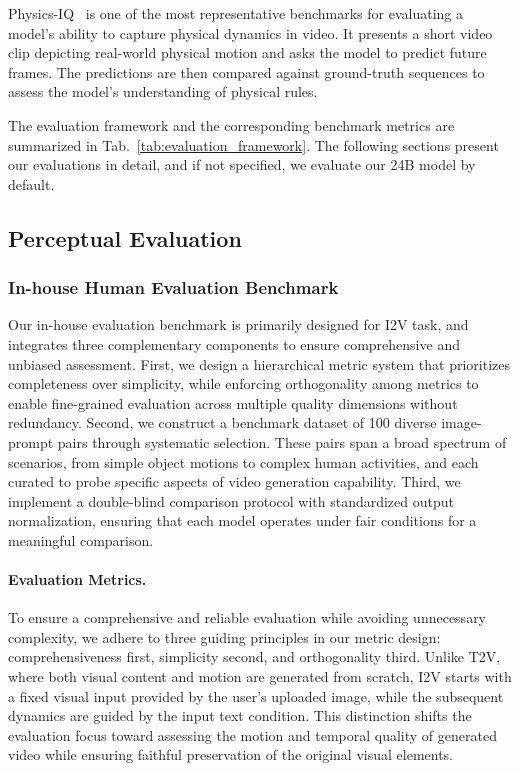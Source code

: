 Physics-IQ~\citep{physicsiqbenchmark} is one of the most representative benchmarks for evaluating a model’s ability to capture physical dynamics in video. It presents a short video clip depicting real-world physical motion and asks the model to predict future frames. The predictions are then compared against ground-truth sequences to assess the model’s understanding of physical rules.

The evaluation framework and the corresponding benchmark metrics are summarized in Tab.~\ref{tab:evaluation_framework}. The following sections present our evaluations in detail, and if not specified, we evaluate our 24B model by default.




\subsection{Perceptual Evaluation}
\subsubsection{In-house Human Evaluation Benchmark}
\label{sec:i2v_human_evaluation} 
Our in-house evaluation benchmark is primarily designed for I2V task, and integrates three complementary components to ensure comprehensive and unbiased assessment.
First, we design a hierarchical metric system that prioritizes completeness over simplicity, while enforcing orthogonality among metrics to enable fine-grained evaluation across multiple quality dimensions without redundancy.
Second, we construct a benchmark dataset of 100 diverse image-prompt pairs through systematic selection. These pairs span a broad spectrum of scenarios, from simple object motions to complex human activities, and each curated to probe specific aspects of video generation capability.
Third, we implement a double-blind comparison protocol with standardized output normalization, ensuring that each model operates under fair conditions for a meaningful comparison.



\paragraph{Evaluation Metrics.}

To ensure a comprehensive and reliable evaluation while avoiding unnecessary complexity, we adhere to three guiding principles in our metric design: comprehensiveness first, simplicity second, and orthogonality third.
Unlike T2V, where both visual content and motion are generated from scratch, I2V starts with a fixed visual input provided by the user’s uploaded image, while the subsequent dynamics are guided by the input text condition. This distinction shifts the evaluation focus toward assessing the motion and temporal quality of generated video while ensuring faithful preservation of the original visual elements.

